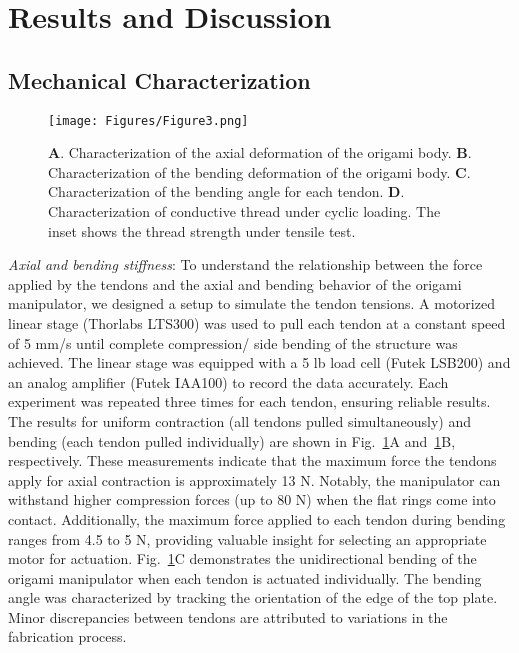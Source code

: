 \documentclass[journal, letterpaper]{IEEEtran}
\begin{document}
\section{Results and Discussion}


\subsection{Mechanical Characterization}

\begin{figure}[tb]
\centering
\texttt{[image: Figures/Figure3.png]}
\caption{\textbf{A}. Characterization of the axial deformation of the origami body. \textbf{B}. Characterization of the bending deformation of the origami body.  \textbf{C}. Characterization of the bending angle for each tendon.  \textbf{D}. Characterization of conductive thread under cyclic loading. The inset shows the thread strength under tensile test.}
\label{Fig3}
\end{figure}

\textit{Axial and bending stiffness}:
To understand the relationship between the force applied by the tendons and the axial and bending behavior of the origami manipulator, we designed a setup to simulate the tendon tensions. A motorized linear stage (Thorlabs LTS300) was used to pull each tendon at a constant speed of 5 mm/s until complete compression/ side bending of the structure was achieved.
The linear stage was equipped with a 5 lb load cell (Futek LSB200) and an analog amplifier (Futek IAA100) to record the data accurately. Each experiment was repeated three times for each tendon, ensuring reliable results. 
The results for uniform contraction (all tendons pulled simultaneously) and bending (each tendon pulled individually) are shown in Fig.~\ref{Fig3}A and~\ref{Fig3}B, respectively. 
These measurements indicate that the maximum force the tendons apply for axial contraction is approximately 13 N. Notably, the manipulator can withstand higher compression forces (up to 80 N) when the flat rings come into contact.
Additionally, the maximum force applied to each tendon during bending ranges from 4.5 to 5 N, providing valuable insight for selecting an appropriate motor for actuation.
Fig.~\ref{Fig3}C demonstrates the unidirectional bending of the origami manipulator when each tendon is actuated individually. The bending angle was characterized by tracking the orientation of the edge of the top plate. Minor discrepancies between tendons are attributed to variations in the fabrication process. 
\end{document}
